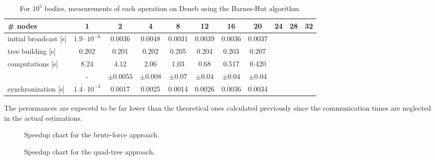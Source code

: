 \begin{table}
\centering
\begin{tabular}{l|cccccccccc}
\# nodes & 1 & 2 & 4 & 8 & 12 & 16 & 20 & 24 & 28 & 32\\
\hline initial broadcast [s] & $1.9\cdot10^{-6}$ & 0.0036 & 0.0048 & 0.0031 & 0.0039 & 0.0036 & 0.0037 \\
tree building [s] & 0.202 & 0.201 & 0.202 & 0.205 & 0.204 & 0.203 &0.207 \\
computations [s] & 8.24 & $4.12$ & 2.06 & 1.03 &  0.68  & 0.517 &0.420 \\
& - & $\pm 0.0055$ & $\pm 0.008$ & $\pm0.07$ & $\pm 0.04$ & $\pm 0.04$ & $\pm0.04$  \\
synchronization [s] & $1.4\cdot 10^{-3}$ & 0.0017 & 0.0025 & 0.0014 & 0.0026 &  0.0036& 0.0034 \\
\end{tabular}
\caption{For $10^5$ bodies, measurements of each operation on Deneb using the Barnes-Hut algorithm.}
\label{tab:qt:measure}
\end{table}


The perormances are expecetd to be far lower than the theoretical ones calculated previously since the communication times are neglected in the actual estimations. 
\begin{figure}

\caption{Speedup chart for the brute-force approach.}
\end{figure}

\begin{figure}

\caption{Speedup chart for the quad-tree approach.}
\end{figure}
